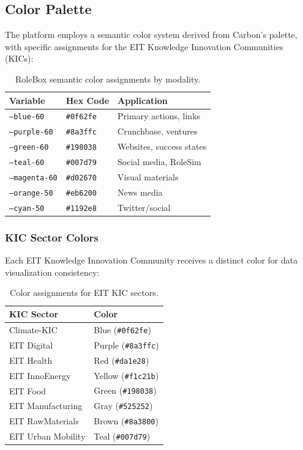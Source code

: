 \subsection{Color Palette}

The platform employs a semantic color system derived from Carbon's palette, with specific assignments for the EIT Knowledge Innovation Communities (KICs):

\begin{table}[h]
\centering
\small
\begin{tabular}{lll}
\toprule
\textbf{Variable} & \textbf{Hex Code} & \textbf{Application} \\
\midrule
\texttt{--blue-60} & \texttt{\#0f62fe} & Primary actions, links \\
\texttt{--purple-60} & \texttt{\#8a3ffc} & Crunchbase, ventures \\
\texttt{--green-60} & \texttt{\#198038} & Websites, success states \\
\texttt{--teal-60} & \texttt{\#007d79} & Social media, RoleSim \\
\texttt{--magenta-60} & \texttt{\#d02670} & Visual materials \\
\texttt{--orange-50} & \texttt{\#eb6200} & News media \\
\texttt{--cyan-50} & \texttt{\#1192e8} & Twitter/social \\
\bottomrule
\end{tabular}
\caption{RoleBox semantic color assignments by modality.}
\end{table}

\subsubsection{KIC Sector Colors}

Each EIT Knowledge Innovation Community receives a distinct color for data visualization consistency:

\begin{table}[h]
\centering
\small
\begin{tabular}{ll}
\toprule
\textbf{KIC Sector} & \textbf{Color} \\
\midrule
Climate-KIC & Blue (\texttt{\#0f62fe}) \\
EIT Digital & Purple (\texttt{\#8a3ffc}) \\
EIT Health & Red (\texttt{\#da1e28}) \\
EIT InnoEnergy & Yellow (\texttt{\#f1c21b}) \\
EIT Food & Green (\texttt{\#198038}) \\
EIT Manufacturing & Gray (\texttt{\#525252}) \\
EIT RawMaterials & Brown (\texttt{\#8a3800}) \\
EIT Urban Mobility & Teal (\texttt{\#007d79}) \\
\bottomrule
\end{tabular}
\caption{Color assignments for EIT KIC sectors.}
\end{table}

